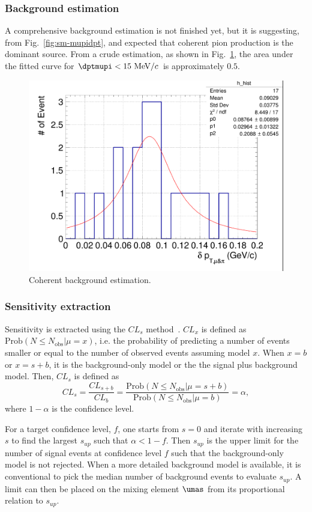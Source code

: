     
    \subsubsection{Background estimation}
        A comprehensive background estimation is not finished yet, but it is suggesting, from Fig.~\ref{fig:sm-mupidpt}, and expected that coherent pion production is the dominant source. 
        From a crude estimation, as shown in Fig.~\ref{fig:coh-bkg}, the area under the fitted curve for $\dptmupi<15~\mevc$ is approximately $0.5$. 
        \begin{figure}[!htb] 
            \centering
            \includegraphics[width=0.5\linewidth]{figures/COH.png}
            \caption{Coherent background estimation.}
            \label{fig:coh-bkg}
        \end{figure}    
        
    \subsubsection{Sensitivity extraction}
        Sensitivity is extracted using the $CL_s$ method~\cite{Read:2002hq}.
        $CL_x$ is defined as $\textrm{Prob}(N\leq N_{\textrm{obs}}| \mu = x)$, i.e. the probability of predicting a number of events smaller or equal to the number of observed events assuming model $x$. When $x=b$ or $x=s+b$, it is the background-only model or the the signal plus background model.
        Then, $CL_s$ is defined as 
        \begin{equation}
            CL_s = \frac{CL_{s+b}}{CL_{b}} = \frac{\textrm{Prob}(N\leq N_{\textrm{obs}}| \mu = s+b)}{\textrm{Prob}(N\leq N_{\textrm{obs}}| \mu = b)} = \alpha,
        \end{equation}
        where $1-\alpha$ is the confidence level.

        For a target confidence level, $f$, one starts from $s=0$ and iterate with increasing $s$ to find the largest $s_{up}$ such that $\alpha < 1-f$. 
        Then $s_{up}$ is the upper limit for the number of signal events at confidence level $f$ such that the background-only model is not rejected. 
        When a more detailed background model is available, it is conventional to pick the median number of background events to evaluate $s_{up}$.
        A limit can then be placed on the mixing element $\umas$ from its proportional relation to $s_{up}$.

